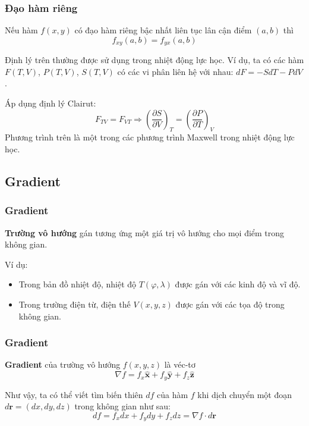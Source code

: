 \begin{frame}
\frametitle{Đạo hàm riêng}
\begin{tcolorbox}[colback=blue!10!, colframe=blue!50!black, title=Định lý Clairut]
Nếu hàm \(f(x,y)\) có đạo hàm riêng bậc nhất liên tục lân cận điểm \((a,b)\) thì
\begin{equation}
f_{xy}(a,b) = f_{yx}(a,b)
\end{equation}
\end{tcolorbox}
\small
Định lý trên thường được sử dụng trong nhiệt động lực học. Ví dụ, ta có các hàm \(F(T, V)\), \(P(T, V)\), \(S(T, V)\) có các vi phân liên hệ với nhau: \(dF=-SdT-PdV\).

Áp dụng định lý Clairut:
\begin{equation}
F_{TV} = F_{VT} \Rightarrow \left(\frac{\partial S}{\partial V}\right)_T = \left(\frac{\partial P}{\partial T}\right)_V
\end{equation}
Phương trình trên là một trong các phương trình Maxwell trong nhiệt động lực học.
\normalsize
\end{frame}

\subsection{Gradient}
\begin{frame}
\frametitle{Gradient}
\begin{tcolorbox} [colback=blue!10!, colframe=blue!50!black, title=Định nghĩa]
    \textbf{Trường vô hướng} gán tương ứng một giá trị vô hướng cho mọi điểm trong không gian.
\end{tcolorbox}
Ví dụ:
\begin{itemize}
\item Trong bản đồ nhiệt độ, nhiệt độ \(T(\varphi, \lambda)\) được gán với các kinh độ và vĩ độ.
\item Trong trường điện từ, điện thế \(V(x, y, z)\) được gán với các tọa độ trong không gian.
\end{itemize}
\end{frame}

\begin{frame}
\frametitle{Gradient}
\begin{tcolorbox} [colback=blue!10!, colframe=blue!50!black, title=Định nghĩa]
    \textbf{Gradient} của trường vô hướng \(f(x, y, z)\) là véc-tơ
    \begin{equation}
    \nabla f = f_x \mathbf{\hat{x}}+f_y \mathbf{\hat{y}} + f_z \mathbf{\hat{z}}
    \end{equation}
\end{tcolorbox}
Như vậy, ta có thể viết tìm biến thiên \(df\) của hàm \(f\) khi dịch chuyển một đoạn \(d\mathbf r=(dx, dy, dz)\) trong không gian như sau:
\begin{equation}
df = f_x dx + f_y dy + f_z dz = \nabla f \cdot d\mathbf r
\end{equation}
\end{frame}


